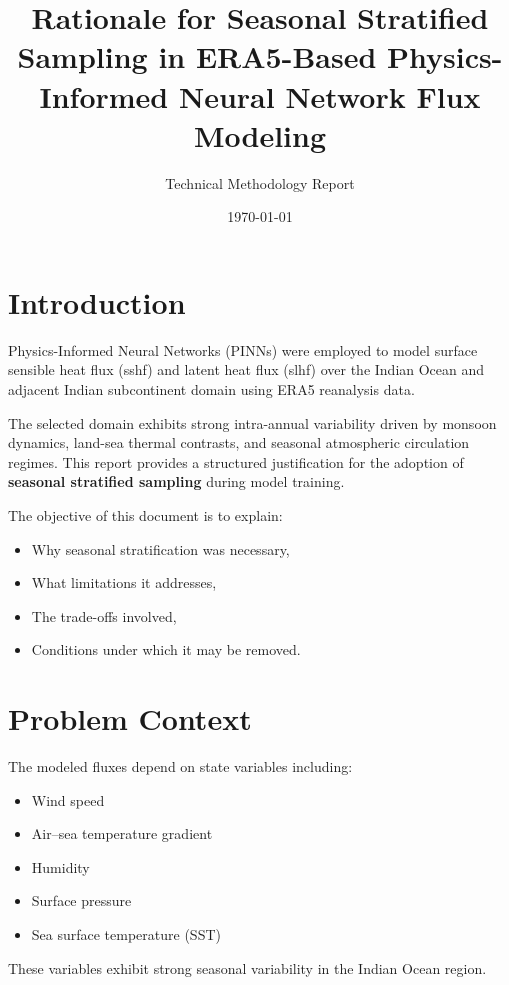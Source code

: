 \documentclass[12pt]{article}
\title{\textbf{Rationale for Seasonal Stratified Sampling in ERA5-Based Physics-Informed Neural Network Flux Modeling}}
\author{Technical Methodology Report}
\date{\today}
\begin{document}
\maketitle
\tableofcontents
\newpage

\section{Introduction}

Physics-Informed Neural Networks (PINNs) were employed to model surface sensible heat flux (sshf) and latent heat flux (slhf) over the Indian Ocean and adjacent Indian subcontinent domain using ERA5 reanalysis data. 

The selected domain exhibits strong intra-annual variability driven by monsoon dynamics, land-sea thermal contrasts, and seasonal atmospheric circulation regimes. This report provides a structured justification for the adoption of \textbf{seasonal stratified sampling} during model training.

The objective of this document is to explain:

\begin{itemize}
    \item Why seasonal stratification was necessary,
    \item What limitations it addresses,
    \item The trade-offs involved,
    \item Conditions under which it may be removed.
\end{itemize}

\section{Problem Context}

The modeled fluxes depend on state variables including:

\begin{itemize}
    \item Wind speed
    \item Air–sea temperature gradient
    \item Humidity
    \item Surface pressure
    \item Sea surface temperature (SST)
\end{itemize}

These variables exhibit strong seasonal variability in the Indian Ocean region.
\end{document}
